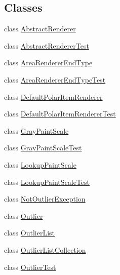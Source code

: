 \subsection*{Classes}
\begin{DoxyCompactItemize}
\item 
class \mbox{\hyperlink{classorg_1_1jfree_1_1chart_1_1renderer_1_1_abstract_renderer}{Abstract\+Renderer}}
\item 
class \mbox{\hyperlink{classorg_1_1jfree_1_1chart_1_1renderer_1_1_abstract_renderer_test}{Abstract\+Renderer\+Test}}
\item 
class \mbox{\hyperlink{classorg_1_1jfree_1_1chart_1_1renderer_1_1_area_renderer_end_type}{Area\+Renderer\+End\+Type}}
\item 
class \mbox{\hyperlink{classorg_1_1jfree_1_1chart_1_1renderer_1_1_area_renderer_end_type_test}{Area\+Renderer\+End\+Type\+Test}}
\item 
class \mbox{\hyperlink{classorg_1_1jfree_1_1chart_1_1renderer_1_1_default_polar_item_renderer}{Default\+Polar\+Item\+Renderer}}
\item 
class \mbox{\hyperlink{classorg_1_1jfree_1_1chart_1_1renderer_1_1_default_polar_item_renderer_test}{Default\+Polar\+Item\+Renderer\+Test}}
\item 
class \mbox{\hyperlink{classorg_1_1jfree_1_1chart_1_1renderer_1_1_gray_paint_scale}{Gray\+Paint\+Scale}}
\item 
class \mbox{\hyperlink{classorg_1_1jfree_1_1chart_1_1renderer_1_1_gray_paint_scale_test}{Gray\+Paint\+Scale\+Test}}
\item 
class \mbox{\hyperlink{classorg_1_1jfree_1_1chart_1_1renderer_1_1_lookup_paint_scale}{Lookup\+Paint\+Scale}}
\item 
class \mbox{\hyperlink{classorg_1_1jfree_1_1chart_1_1renderer_1_1_lookup_paint_scale_test}{Lookup\+Paint\+Scale\+Test}}
\item 
class \mbox{\hyperlink{classorg_1_1jfree_1_1chart_1_1renderer_1_1_not_outlier_exception}{Not\+Outlier\+Exception}}
\item 
class \mbox{\hyperlink{classorg_1_1jfree_1_1chart_1_1renderer_1_1_outlier}{Outlier}}
\item 
class \mbox{\hyperlink{classorg_1_1jfree_1_1chart_1_1renderer_1_1_outlier_list}{Outlier\+List}}
\item 
class \mbox{\hyperlink{classorg_1_1jfree_1_1chart_1_1renderer_1_1_outlier_list_collection}{Outlier\+List\+Collection}}
\item 
class \mbox{\hyperlink{classorg_1_1jfree_1_1chart_1_1renderer_1_1_outlier_test}{Outlier\+Test}}

\end{DoxyCompactItemize}
